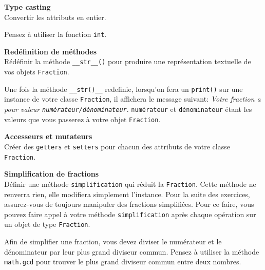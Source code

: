 \begin{Exercice}[5 minutes] \textbf{Type casting}\\
	Convertir les attributs en entier.
	\begin{conseil}
		Pensez à utiliser la fonction \lstinline{int}.
	\end{conseil}
\end{Exercice}

\begin{Exercice}[5 minutes] \textbf{Redéfinition de méthodes} \\
	Rédéfinir la méthode \lstinline{__str__()} pour produire une représentation textuelle de vos objets \lstinline{Fraction}.
	\begin{conseil}
		Une fois la méthode \lstinline{__str()__} redefinie, lorsqu'on fera un \lstinline{print()} sur une instance de votre classe \lstinline{Fraction}, il affichera le message suivant: \textit{Votre fraction a pour valeur \lstinline{numérateur/dénominateur}}. \lstinline{numérateur} et \lstinline{dénominateur} étant les valeurs que vous passerez à votre objet \lstinline{Fraction}.
	\end{conseil}
\end{Exercice}

\begin{Exercice} [5 minutes] \textbf{Accesseurs et mutateurs} \\
	Créer des \lstinline{getters} et \lstinline{setters} pour chacun des attributs de votre classe \lstinline{Fraction}.
\end{Exercice}

\begin{Exercice} [10 minutes] \textbf{Simplification de fractions}\\
	Définir une méthode \lstinline{simplification} qui réduit la \lstinline{Fraction}. Cette méthode ne renverra rien, elle modifiera simplement l'instance. Pour la suite des exercices, assurez-vous de toujours manipuler des fractions simplifiées. Pour ce faire, vous pouvez faire appel à votre méthode \lstinline{simplification} après chaque opération sur un objet de type \lstinline{Fraction}.

	\begin{conseil}
		Afin de simplifier une fraction, vous devez diviser le numérateur et le dénominateur par leur plus grand diviseur commun. Pensez à utiliser la méthode \lstinline{math.gcd} pour trouver le plus grand diviseur commun entre deux nombres.
	\end{conseil}
\end{Exercice}


